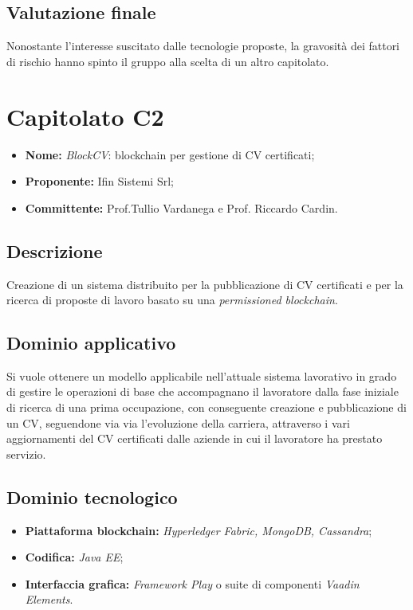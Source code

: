 \documentclass[openany,12pt,a4paper]{report}
\begin{document}
	\subsection{Valutazione finale}

	Nonostante l'interesse suscitato dalle tecnologie proposte, la gravosità dei fattori di rischio hanno spinto il gruppo alla scelta di un altro capitolato.


	\section{Capitolato C2}

	\begin{itemize}
		\item \textbf{Nome:} \textit{BlockCV}: blockchain per gestione di CV certificati;
		\item \textbf{Proponente:} Ifin Sistemi Srl;
		\item \textbf{Committente:} Prof.Tullio Vardanega e Prof. Riccardo Cardin.
	\end{itemize}

	\subsection{Descrizione}

	Creazione di un sistema distribuito per la pubblicazione di CV certificati e per la ricerca di proposte di lavoro basato su una \textit{permissioned blockchain}.

	\subsection{Dominio applicativo}

	Si vuole ottenere un modello applicabile nell'attuale sistema lavorativo in grado di gestire le operazioni di base che accompagnano il lavoratore dalla fase iniziale di ricerca di una prima occupazione, con conseguente creazione e pubblicazione di un CV, seguendone via via l’evoluzione della carriera, attraverso i vari aggiornamenti del CV certificati dalle aziende in cui il lavoratore ha prestato servizio.

	\subsection{Dominio tecnologico}

	\begin{itemize}
		\item \textbf{Piattaforma blockchain:} \textit{Hyperledger Fabric, MongoDB, Cassandra};

		\item \textbf{Codifica:} \textit{Java EE};

		\item \textbf{Interfaccia grafica:} \textit{Framework Play} o suite di componenti \textit{Vaadin Elements}.
	\end{itemize}
\end{document}
